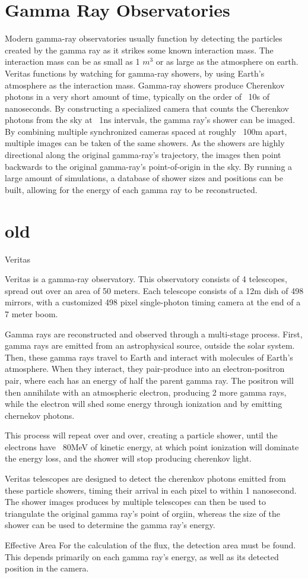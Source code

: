 \section{Gamma Ray Observatories}
Modern gamma-ray observatories usually function by detecting the particles created by the gamma ray as it strikes some known interaction mass.
The interaction mass can be as small as 1 $m^3$ or as large as the atmosphere on earth.
Veritas functions by watching for gamma-ray showers, by using Earth's atmosphere as the interaction mass.
Gamma-ray showers produce Cherenkov photons in a very short amount of time, typically on the order of ~10s of nanoseconds.
By constructing a specialized camera that counts the Cherenkov photons from the sky at ~1ns intervals, the gamma ray's shower can be imaged.
By combining multiple synchronized cameras spaced at roughly ~100m apart, multiple images can be taken of the same showers.
As the showers are highly directional along the original gamma-ray's trajectory, the images then point backwards to the original gamma-ray's point-of-origin in the sky.
By running a large amount of simulations, a database of shower sizes and positions can be built, allowing for the energy of each gamma ray to be reconstructed.


\section{old}
Veritas

Veritas is a gamma-ray observatory.
This observatory consists of 4 telescopes, spread out over an area of 50 meters.
Each telescope consists of a 12m dish of 498 mirrors, with a customized 498 pixel single-photon timing camera at the end of a 7 meter boom.

Gamma rays are reconstructed and observed through a multi-stage process.
First, gamma rays are emitted from an astrophysical source, outside the solar system.
Then, these gamma rays travel to Earth and interact with molecules of Earth's atmosphere.
When they interact, they pair-produce into an electron-positron pair, where each has an energy of half the parent gamma ray.
The positron will then annihilate with an atmospheric electron, producing 2 more gamma rays, while the electron will shed some energy through ionization and by emitting chernekov photons.

This process will repeat over and over, creating a particle shower, until the electrons have ~80MeV of kinetic energy, at which point ionization will dominate the energy loss, and the shower will stop producing cherenkov light.

Veritas telescopes are designed to detect the cherenkov photons emitted from these particle showers, timing their arrival in each pixel to within 1 nanosecond.
The shower images produces by multiple telescopes can then be used to triangulate the original gamma ray's point of orgiin, whereas the size of the shower can be used to determine the gamma ray's energy.


Effective Area
For the calculation of the flux, the detection area must be found.
This depends primarily on each gamma ray's energy, as well as its detected position in the camera.


